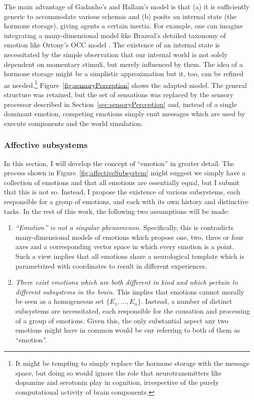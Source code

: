 \pagebreak
The main advantage of Gadanho's and Hallam's model is that (a) it is sufficiently generic to accommodate various schemas and (b) posits an internal state (the hormone storage), giving agents a certain inertia. For example, one can imagine integrating a many-dimensional model like Brazeal's \cite{breazeal2003} detailed taxonomy of emotion like Ortony's OCC model \cite{ortony1988}. The existence of an internal state is necessitated by the simple observation that our internal world is not solely dependent on momentary stimuli, but merely influenced by them. The idea of a hormone storage might be a simplistic approximation but it, too, can be refined as needed.\footnote{It might be tempting to simply replace the hormone storage with the message space, but doing so would ignore the role that neurotransmitters like dopamine and serotonin play in cognition, irrespective of the purely computational activity of brain components.} Figure~\ref{fig:sensoryPerception} shows the adapted model. The general structure was retained, but the set of sensations was replaced by the sensory processor described in Section~\ref{sec:sensoryPerception} and, instead of a single dominant emotion, competing emotions simply emit messages which are used by execute components and the world simulation.

\subsubsection{Affective subsystems}

In this section, I will develop the concept of ``emotion'' in greater detail. The process shown in Figure~\ref{fig:affectiveSubsystem} might suggest we simply have a collection of emotions and that all emotions are essentially equal, but I submit that this is not so. Instead, I propose the existence of various subsystems, each responsible for a group of emotions, and each with its own history and distinctive tasks. In the rest of this work, the following two assumptions will be made:

\begin{enumerate}
	\item {\em ``Emotion'' is not a singular phenomenon.} Specifically, this is contradicts many-dimensional models of emotions which propose one, two, three or four axes and a corresponding vector space in which every emotion is a point. Such a view implies that all emotions share a neurological template which is parametrized with coordinates to result in different experiences.
	\item {\em There exist emotions which are both different in kind and which pertain to different subsystems in the brain.} This implies that emotions cannot morally be seen as a homogeneous set $\{E_1,\dots,E_n\}$. Instead, a number of distinct subsystems are necessitated, each responsible for the causation and processing of a group of emotions. Given this, the only substantial aspect any two emotions might have in common would be our referring to both of them as ``emotion''.
\end{enumerate}

